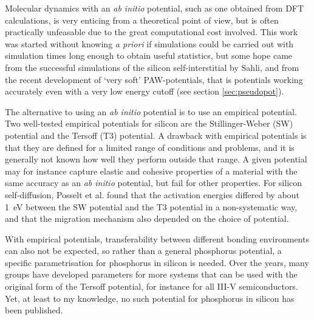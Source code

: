 \documentclass[11pt,bibliography=totoc,index=totoc]{scrbook}   %
\newcommand{\comment}[1]{\hl{#1}}
\begin{document}

Molecular dynamics with an \textit{ab initio} potential, such as one obtained from DFT calculations, is very enticing from a theoretical point of view,
but is often practically unfeasable due to the great computational cost involved.
This work was started without knowing \textit{a priori} if simulations could be carried out with simulation times long enough to obtain useful statistics,
but some hope came from the successful simulations of the silicon self-interstitial by Sahli,\cite{Sahli:2005}
and from the recent development of `very soft' PAW-potentials, that is potentials working accurately even with a very low energy cutoff (see section \ref{sec:pseudopot}).

The alternative to using an \textit{ab initio} potential is to use an empirical potential. 
Two well-tested empirical potentials for silicon are the Stillinger-Weber (SW) potential\cite{Stillinger:1985} and the Tersoff (T3) potential.\cite{Tersoff} 
A drawback with empirical potentials is that they are defined for a limited range of conditions and problems, 
and it is generally not known how well they perform outside that range.
A given potential may for instance capture elastic and cohesive properties of a material with the same accuracy as an \textit{ab initio} potential, 
but fail for other properties.\cite{Powell:2007}
For silicon self-diffusion, Posselt et al. found that the activation energies differed by about 1~eV between the SW potential and the T3 potential in a non-systematic way, and that the migration mechanism also depended on the choice of potential.\cite{Posselt:2008}

With empirical potentials, transferability between different bonding environments can also not be expected, so rather than a general phosphorus potential, a specific parametrisation for phosphorus in silicon is needed.
Over the years, many groups have developed parameters for more systems that can be used with the original form of the Tersoff potential, for instance for all III-V semiconductors.\cite{Powell:2007}
Yet, at least to my knowledge, no such potential for phosphorus in silicon has been published.
\end{document}
